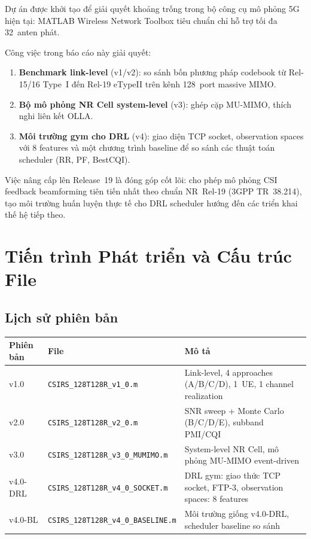 \documentclass[12pt, a4paper]{article}
\newcommand{\file}[1]{\texttt{#1}}
\begin{document}
Dự án được khởi tạo để giải quyết khoảng trống trong bộ công cụ mô
phỏng 5G hiện tại: MATLAB Wireless Network Toolbox tiêu chuẩn chỉ hỗ
trợ tối đa 32~anten phát.

Công việc trong báo cáo này giải quyết:

\begin{enumerate}[nosep]
  \item \textbf{Benchmark link-level} (v1/v2): so sánh bốn phương pháp codebook
        từ Rel-15/16 Type~I đến Rel-19 eTypeII trên kênh 128~port massive MIMO.
  \item \textbf{Bộ mô phỏng NR Cell system-level} (v3): ghép cặp
        MU-MIMO, thích nghi liên kết OLLA.
  \item \textbf{Môi trường gym cho DRL} (v4): giao diện TCP socket, observation spaces với 8 features và một chương trình baseline để so sánh các thuật toán scheduler (RR, PF, BestCQI).
\end{enumerate}

Việc nâng cấp lên Release~19 là đóng góp cốt lõi: cho phép mô phỏng
CSI feedback beamforming tiên tiến nhất theo chuẩn NR~Rel-19
(3GPP TR~38.214), tạo môi trường huấn luyện thực tế cho DRL scheduler
hướng đến các triển khai thế hệ tiếp theo.

\section{Tiến trình Phát triển và Cấu trúc File}

\subsection{Lịch sử phiên bản}

\begin{center}
\begin{tabular}{L{1.4cm} L{6.1cm} L{7cm}}
\toprule
\textbf{Phiên bản} & \textbf{File} & \textbf{Mô tả} \\
\midrule
v1.0 & \file{CSIRS\_128T128R\_v1\_0.m} &
  Link-level, 4 approaches (A/B/C/D), 1~UE, 1 channel realization \\[3pt]
v2.0 & \file{CSIRS\_128T128R\_v2\_0.m} &
  SNR sweep + Monte Carlo (B/C/D/E), subband PMI/CQI \\[3pt]
v3.0 & \file{CSIRS\_128T128R\_v3\_0\_MUMIMO.m} &
  System-level NR Cell, mô phỏng MU-MIMO event-driven \\[3pt]
v4.0-DRL & \file{CSIRS\_128T128R\_v4\_0\_SOCKET.m} &
  DRL gym: giao thức TCP socket, FTP-3, observation spaces: 8 features \\[3pt]
v4.0-BL & \file{CSIRS\_128T128R\_v4\_0\_BASELINE.m} &
  Môi trường giống v4.0-DRL, scheduler baseline so sánh \\
\bottomrule
\end{tabular}
\label{tab:versions}
\end{center}
\end{document}

